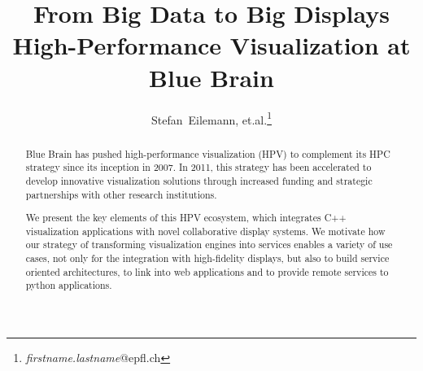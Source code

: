 \documentclass[10pt]{llncs}
\begin{document}
\lstset{language=[11]C++,basicstyle=\scriptsize,captionpos=b}
%
\title{From Big Data to Big Displays\\
High-Performance Visualization at Blue Brain}

%
%
%
%

\author{Stefan~Eilemann, et.al.\thanks{\textit{firstname.lastname}@epfl.ch}}

\maketitle


\begin{abstract}
  Blue Brain has pushed high-performance visualization (HPV) to complement its
  HPC strategy since its inception in 2007. In 2011, this strategy has been
  accelerated to develop innovative visualization solutions through increased
  funding and strategic partnerships with other research institutions.

  We present the key elements of this HPV ecosystem, which integrates C++
  visualization applications with novel collaborative display systems. We
  motivate how our strategy of transforming visualization engines into services
  enables a variety of use cases, not only for the integration with
  high-fidelity displays, but also to build service oriented architectures, to
  link into web applications and to provide remote services to python
  applications.
\end{abstract}
\end{document}
